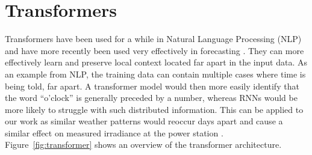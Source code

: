 


\section{Transformers\label{cha:transformer}}
 
Transformers have been used for a while in Natural Language Processing (NLP) and have more recently been used very effectively in forecasting \cite{vaswani_attention_2017}. They can more effectively learn and preserve local context located far apart in the input data. As an example from NLP, the training data can contain multiple cases where time is being told, far apart. A transformer model would then more easily identify that the word \enquote{o’clock} is generally preceded by a number, whereas RNNs would be more likely to struggle with such distributed information. This can be applied to our work as similar weather patterns would reoccur days apart and cause a similar effect on measured irradiance at the power station \cite{lim_time_2021}. Figure~\ref{fig:transformer} shows an overview of the transformer architecture.


